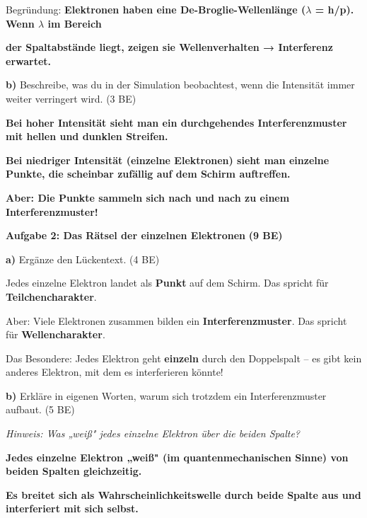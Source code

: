 \documentclass[11pt,a4paper]{article}
\newcommand{\lsg}[1]{\textcolor{loesung}{\textbf{#1}}}
\begin{document}
\vspace{0.3em}
Begründung: \lsg{Elektronen haben eine De-Broglie-Wellenlänge ($\lambda$ = h/p). Wenn $\lambda$ im Bereich}

\lsg{der Spaltabstände liegt, zeigen sie Wellenverhalten → Interferenz erwartet.}

\vspace{0.5em}

\textbf{b)} Beschreibe, was du in der Simulation beobachtest, wenn die Intensität immer weiter verringert wird. \hfill (3 BE)

\lsg{Bei hoher Intensität sieht man ein durchgehendes Interferenzmuster mit hellen und dunklen Streifen.}

\lsg{Bei niedriger Intensität (einzelne Elektronen) sieht man einzelne Punkte, die scheinbar zufällig auf dem Schirm auftreffen.}

\lsg{Aber: Die Punkte sammeln sich nach und nach zu einem Interferenzmuster!}

\vspace{0.3em}


\textbf{Aufgabe 2: Das Rätsel der einzelnen Elektronen} \hfill \textbf{(9 BE)}

\textbf{a)} Ergänze den Lückentext. \hfill (4 BE)

\begin{tcolorbox}[lueckenbox]
Jedes einzelne Elektron landet als \lsg{Punkt} auf dem Schirm. Das spricht für \lsg{Teilchencharakter}.

Aber: Viele Elektronen zusammen bilden ein \lsg{Interferenzmuster}. Das spricht für \lsg{Wellencharakter}.

Das Besondere: Jedes Elektron geht \lsg{einzeln} durch den Doppelspalt – es gibt kein anderes Elektron, mit dem es interferieren könnte!
\end{tcolorbox}

\newpage

\textbf{b)} Erkläre in eigenen Worten, warum sich trotzdem ein Interferenzmuster aufbaut. \hfill (5 BE)

\textit{Hinweis: Was „weiß" jedes einzelne Elektron über die beiden Spalte?}

\lsg{Jedes einzelne Elektron „weiß" (im quantenmechanischen Sinne) von beiden Spalten gleichzeitig.}

\lsg{Es breitet sich als Wahrscheinlichkeitswelle durch beide Spalte aus und interferiert mit sich selbst.}
\end{document}
